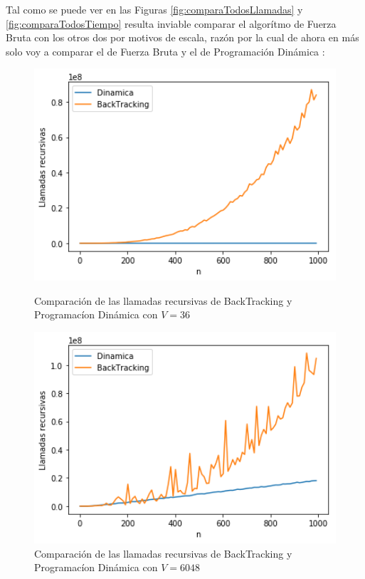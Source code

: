 Tal como se puede ver en las Figuras \ref{fig:comparaTodosLlamadas} y \ref{fig:comparaTodosTiempo} resulta
inviable comparar el algor\'itmo de Fuerza Bruta con los otros dos por motivos de escala, 
raz\'on por la cual de ahora en m\'as solo voy a comparar el de Fuerza Bruta y el de Programaci\'on Din\'amica :
\begin{figure}[H] 
    \centering
    \begin{minipage}{0.45\textwidth}
        \centering 
        \includegraphics[width=1\textwidth]{img/llamadas/v/llamadasBackDinamicavChico.png} %
        \caption{Comparaci\'on de las llamadas recursivas de BackTracking y Programac\'ion Din\'amica con $V = 36$}
        \label{fig:llamadasBackDinamicavChico}
    \end{minipage}\hfill
    \begin{minipage}{0.45\textwidth}
        \centering
        \includegraphics[width=1\textwidth]{img/llamadas/v/llamadasBackDinamicavGrande.png} %
        \caption{Comparaci\'on de las llamadas recursivas de BackTracking y Programac\'ion Din\'amica con $V = 6048$}
        \label{fig:llamadasBackDinamicavGrande} 
    \end{minipage}
\end{figure}

